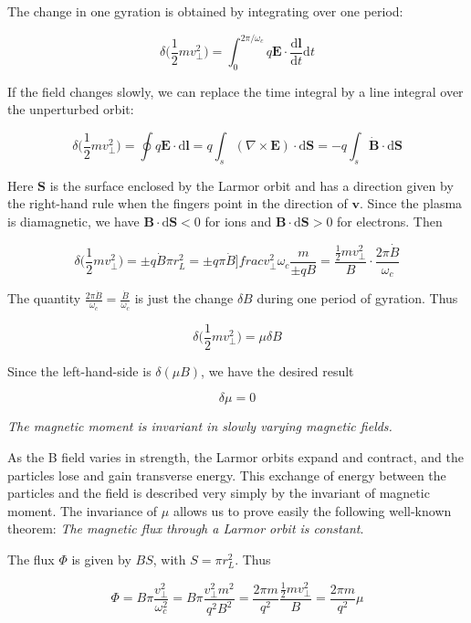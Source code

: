 \documentclass[
  notoc %
]{tufte-book}
\begin{document}
The change in one gyration is obtained by integrating over one period:

\[
\delta \Big( \frac{1}{2}mv_\perp^2  \Big) = \int_0^{2\pi/\omega_c}q\mathbf{E}\cdot\frac{\mathrm{d}\mathbf{l}}{\mathrm{d}t}\mathrm{d}t
\]

If the field changes slowly, we can replace the time integral by a line
integral over the unperturbed orbit:

\[
\delta \Big( \frac{1}{2}mv_\perp^2  \Big) = \oint q\mathbf{E}\cdot \mathrm{d}\mathbf{l} = q\int_s (\nabla\times\mathbf{E})\cdot \mathrm{d}\mathbf{S} = -q \int_s\dot{\mathbf{B}}\cdot \mathrm{d}\mathbf{S}
\]

Here \(\mathbf{S}\) is the surface enclosed by the Larmor orbit and has
a direction given by the right-hand rule when the fingers point in the
direction of \(\mathbf{v}\). Since the plasma is diamagnetic, we have
\(\mathbf{B}\cdot \mathrm{d}\mathbf{S}<0\) for ions and
\(\mathbf{B}\cdot \mathrm{d}\mathbf{S}>0\) for electrons. Then

\[
\delta \Big( \frac{1}{2}mv_\perp^2  \Big) = \pm q \dot{B}\pi r_L^2 = \pm q \pi\dot{B}]frac{v_\perp^2}{\omega_c}\frac{m}{\pm qB} = \frac{\frac{1}{2}mv_\perp^2}{B}\cdot \frac{2\pi \dot{B}}{\omega_c}
\]

The quantity \(\frac{2\pi\dot{B}}{\omega_c} = \frac{\dot{B}}{\omega_c}\)
is just the change \(\delta B\) during one period of gyration. Thus

\[
\delta \Big( \frac{1}{2}mv_\perp^2  \Big) = \mu \delta B
\]

Since the left-hand-side is \(\delta(\mu B)\), we have the desired
result

\[
\delta \mu = 0
\]

\emph{The magnetic moment is invariant in slowly varying magnetic
fields.}

As the B field varies in strength, the Larmor orbits expand and
contract, and the particles lose and gain transverse energy. This
exchange of energy between the particles and the field is described very
simply by the invariant of magnetic moment. The invariance of \(\mu\)
allows us to prove easily the following well-known theorem: \emph{The
magnetic flux through a Larmor orbit is constant}.

The flux \(\Phi\) is given by \(BS\), with \(S = \pi r_L^2\). Thus

\[
\Phi = B\pi\frac{v_\perp^2}{\omega_c^2} = B\pi\frac{v_\perp^2 m^2}{q^2 B^2} = \frac{2\pi m}{q^2}\frac{\frac{1}{2}mv_\perp^2}{B} = \frac{2\pi m}{q^2}\mu
\]
\end{document}
